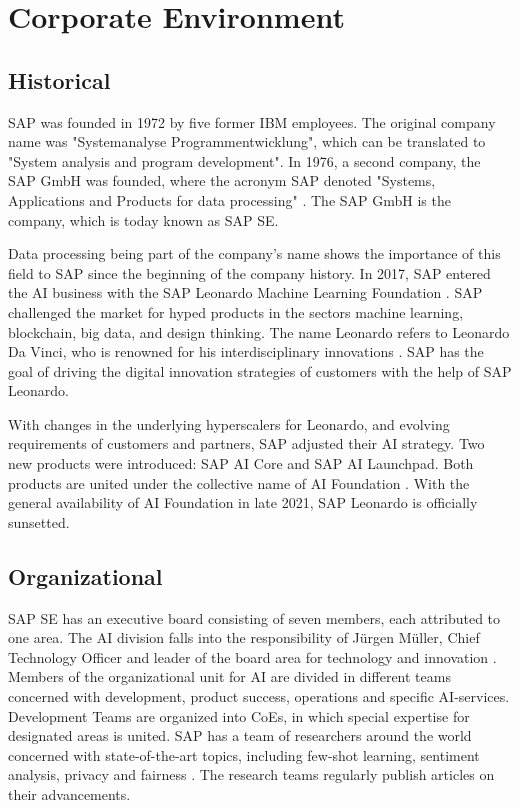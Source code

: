 \chapter{Corporate Environment}

	\section{Historical}
	SAP was founded in 1972 by five former IBM employees. The original company name was "Systemanalyse Programmentwicklung", which can be translated to "System analysis and program development". In 1976, a second company, the SAP GmbH was founded, where the acronym SAP denoted "Systems, Applications and Products for data processing" \cite{GeschichteSAP1972}. The SAP GmbH is the company, which is today known as SAP SE. 
	
	Data processing being part of the company's name shows the importance of this field to SAP since the beginning of the company history.
	In 2017, SAP entered the \ac{AI} business with the SAP Leonardo Machine Learning Foundation \cite{rutschmannSAPLeonardo2021}. SAP challenged the market for hyped products in the sectors machine learning, blockchain, big data, and design thinking. The name Leonardo refers to Leonardo Da Vinci, who is renowned for his interdisciplinary innovations \cite{schmitzLeonardo}. SAP has the goal of driving the digital innovation strategies of customers with the help of SAP Leonardo.
	
	
	With changes in the underlying hyperscalers for Leonardo, and evolving requirements of customers and partners, SAP adjusted their AI strategy. Two new products were introduced: SAP AI Core and SAP AI Launchpad. Both products are united under the collective name of AI Foundation \cite{rutschmannSAPLeonardo2021}. With the general availability of AI Foundation in late 2021, SAP Leonardo is officially sunsetted.
	
	\section{Organizational}
	SAP SE has an executive board consisting of seven members, each attributed to one area. The \ac{AI} division falls into the responsibility of Jürgen Müller, Chief Technology Officer and leader of the board area for technology and innovation \cite{JuergenMuellerBiography}.
	Members of the organizational unit for \ac{AI} are divided in different teams concerned with development, product success, operations and specific \ac{AI}-services. Development Teams are organized into \acp{CoE}, in which special expertise for designated areas is united.
	SAP has a team of researchers around the world concerned with state-of-the-art topics, including few-shot learning, sentiment analysis, privacy and fairness \cite{AIOverviewResearch}. The research teams regularly publish articles on their advancements.
